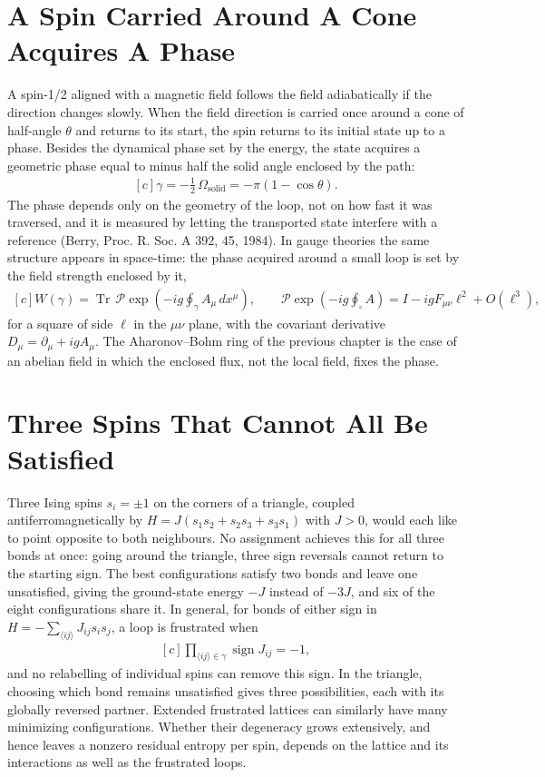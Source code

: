 \documentclass[11pt,oneside]{book}
\newenvironment{centeredalign}{\[\begin{gathered}[c]}{\end{gathered}\]}
\begin{document}
\section{A Spin Carried Around A Cone Acquires A Phase}
A spin-1/2 aligned with a magnetic field follows the field adiabatically if the direction changes slowly. When the
field direction is carried once around a cone of half-angle \(\theta\) and returns to its start, the spin returns to
its initial state up to a phase. Besides the dynamical phase set by the energy, the state acquires a geometric phase
equal to minus half the solid angle enclosed by the path:
\begin{centeredalign}
\gamma=-\tfrac12\,\Omega_{\mathrm{solid}}=-\pi(1-\cos\theta).
\end{centeredalign}
The phase depends only on the geometry of the loop, not on how fast it was traversed, and it is measured by letting the
transported state interfere with a reference (Berry, Proc. R. Soc. A 392, 45, 1984). In gauge theories the same
structure appears in space-time: the phase acquired around a small loop is set by the field strength enclosed by it,
\begin{centeredalign}
W(\gamma)=\operatorname{Tr}\,\mathcal P\exp\!\left(-ig\oint_\gamma A_\mu\,dx^\mu\right),\qquad
\mathcal P\exp\!\left(-ig\oint_{\square}A\right)=I-igF_{\mu\nu}\ell^2+O(\ell^3),
\end{centeredalign}
for a square of side \(\ell\) in the \(\mu\nu\) plane, with the covariant derivative \(D_\mu=\partial_\mu+igA_\mu\). The
Aharonov--Bohm ring of the previous chapter is the case of an abelian field in which the enclosed flux, not the local
field, fixes the phase.

\section{Three Spins That Cannot All Be Satisfied}
Three Ising spins \(s_i=\pm1\) on the corners of a triangle, coupled antiferromagnetically by
\(H=J(s_1s_2+s_2s_3+s_3s_1)\) with \(J>0\), would each like to point opposite to both neighbours. No assignment achieves
this for all three bonds at once: going around the triangle, three sign reversals cannot return to the starting sign.
The best configurations satisfy two bonds and leave one unsatisfied, giving the ground-state energy \(-J\) instead of
\(-3J\), and six of the eight configurations share it. In general, for bonds of either sign in
\(H=-\sum_{\langle ij\rangle}J_{ij}s_is_j\), a loop is frustrated when
\begin{centeredalign}
\prod_{\langle ij\rangle\in\gamma}\operatorname{sign}J_{ij}=-1,
\end{centeredalign}
and no relabelling of individual spins can remove this sign. In the
triangle, choosing which bond remains unsatisfied gives three possibilities,
each with its globally reversed partner. Extended frustrated lattices can
similarly have many minimizing configurations. Whether their degeneracy
grows extensively, and hence leaves a nonzero residual entropy per spin,
depends on the lattice and its interactions as well as the frustrated loops.
\end{document}
